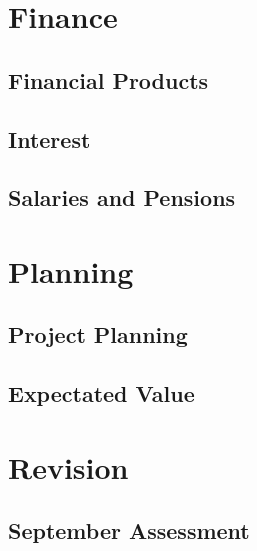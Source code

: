 \documentclass[
  11pt,
  openany]{book}
\begin{document}
\part{Finance}\label{part-finance}

\chapter{Financial Products}\label{financial-products}

\chapter{Interest}\label{interest}

\chapter{Salaries and Pensions}\label{salaries-and-pensions}

\part{Planning}\label{part-planning}

\chapter{Project Planning}\label{project-planning}

\chapter{Expectated Value}\label{expectated-value}

\part{Revision}\label{part-revision}

\chapter*{September Assessment}\label{september-assessment}


\end{document}
